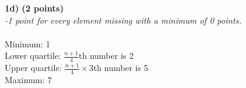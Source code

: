 \begin{itemize}
     \item[\textbf{1d)}] \textbf{(2 points)} \\
     \textit{-1 point for every element missing with a minimum of 0 points.}\\
     \\
     Minimum: 1 \\
     Lower quartile: $\frac{n + 1}{4}$th number is 2\\
     Upper quartile: $\frac{n + 1}{4} \times 3$th number is 5\\
     Maximum: 7
    
\end{itemize}

\normalfont

\clearpage %